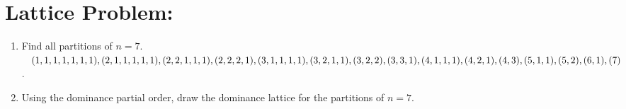 \documentclass[12pt]{article}
\begin{document}
\section{Lattice Problem:}
\begin{enumerate}
    \item Find all partitions of $n=7$.\newline$(1,1,1,1,1,1,1),(2,1,1,1,1,1),(2,2,1,1,1),(2,2,2,1),(3,1,1,1,1),\newline(3,2,1,1),(3,2,2),(3,3,1),(4,1,1,1),(4,2,1),(4,3),(5,1,1),(5,2),\newline(6,1),(7)$.
    \item Using the dominance partial order, draw the dominance lattice for the partitions of $n=7$.
    \newline{}
\end{enumerate}
\end{document}
